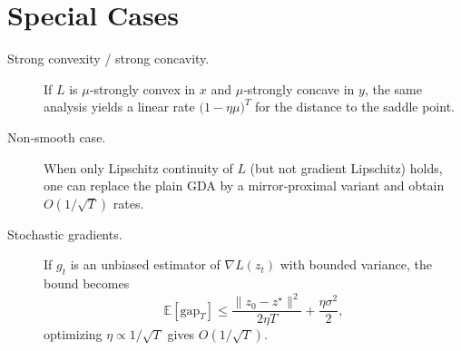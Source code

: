\documentclass{article}
\begin{document}
\section*{Special Cases}
\begin{description}
\item[Strong convexity / strong concavity.] If $L$ is $\mu$‑strongly convex in $x$ and $\mu$‑strongly concave in $y$, the same analysis yields a linear rate $\bigl(1-\eta\mu\bigr)^{T}$ for the distance to the saddle point.
\item[Non‑smooth case.] When only Lipschitz continuity of $L$ (but not gradient Lipschitz) holds, one can replace the plain GDA by a mirror‑proximal variant and obtain $O(1/\sqrt{T})$ rates.
\item[Stochastic gradients.] If $g_{t}$ is an unbiased estimator of $\nabla L(z_{t})$ with bounded variance, the bound becomes
\[
\mathbb{E}[\text{gap}_{T}]\le \frac{\|z_{0}-z^{\star}\|^{2}}{2\eta T}+ \frac{\eta\sigma^{2}}{2},
\]
optimizing $\eta\propto 1/\sqrt{T}$ gives $O(1/\sqrt{T})$.
\end{description}
\end{document}
